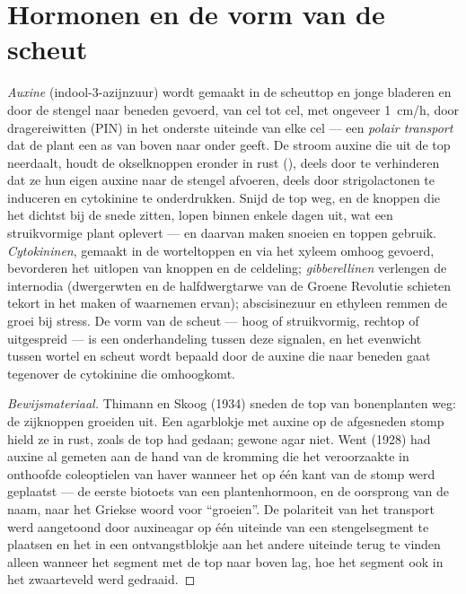 \section{Hormonen en de vorm van de scheut}

\begin{proposition}\label{prop:b2:plant-meristems:apical}
\emph{Auxine} (indool-3-azijnzuur) wordt gemaakt in de scheuttop en jonge
bladeren en door de stengel naar beneden gevoerd, van cel tot cel, met
ongeveer \qty{1}{cm/h}, door dragereiwitten (PIN) in het onderste uiteinde
van elke cel --- een \emph{polair transport} dat de plant een as van boven
naar onder geeft. De stroom auxine die uit de top neerdaalt, houdt de
okselknoppen eronder in rust (\emph{}), deels door te
verhinderen dat ze hun eigen auxine naar de stengel afvoeren, deels door
strigolactonen te induceren en cytokinine te onderdrukken. Snijd de top
weg, en de knoppen die het dichtst bij de snede zitten, lopen binnen enkele
dagen uit, wat een struikvormige plant oplevert --- en daarvan maken snoeien
en toppen gebruik. \emph{Cytokininen}, gemaakt in de worteltoppen en via
het xyleem omhoog gevoerd, bevorderen het uitlopen van knoppen en de
celdeling; \emph{gibberellinen} verlengen de internodia (dwergerwten en de
halfdwergtarwe van de Groene Revolutie schieten tekort in het maken of
waarnemen ervan); abscisinezuur en ethyleen remmen de groei bij stress. De
vorm van de scheut --- hoog of struikvormig, rechtop of uitgespreid --- is
een onderhandeling tussen deze signalen, en het evenwicht tussen wortel en
scheut wordt bepaald door de auxine die naar beneden gaat tegenover de
cytokinine die omhoogkomt.
\end{proposition}
\begin{proof}[Bewijsmateriaal]
Thimann en Skoog (1934) sneden de top van bonenplanten weg: de zijknoppen
groeiden uit. Een agarblokje met auxine op de afgesneden stomp hield ze in
rust, zoals de top had gedaan; gewone agar niet. Went (1928) had auxine al
gemeten aan de hand van de kromming die het veroorzaakte in onthoofde
coleoptielen van haver wanneer het op één kant van de stomp werd
geplaatst --- de eerste biotoets van een plantenhormoon, en de oorsprong
van de naam, naar het Griekse woord voor ``groeien''. De polariteit van het
transport werd aangetoond door auxineagar op één uiteinde van een
stengelsegment te plaatsen en het in een ontvangstblokje aan het andere
uiteinde terug te vinden alleen wanneer het segment met de top naar boven
lag, hoe het segment ook in het zwaarteveld werd gedraaid.
\end{proof}

